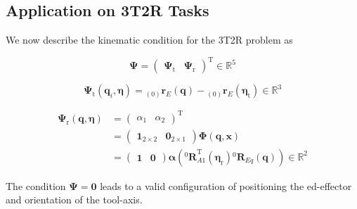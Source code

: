 \documentclass[twocolumn,10pt]{IFTOMM}
\newcommand{\bm}[1]{\boldsymbol{#1}}
\newcommand{\ortvek}[4]{{ }_{(#1)}{\boldsymbol{#2}}^{#3}_{#4} }
\newcommand{\rotmat}[2]{{{ }^{#1}\boldsymbol{R}}_{#2}}
\newcommand{\transp}[0]{{\mathrm{T}}}
\begin{document}
\subsection{Application on 3T2R Tasks}


We now describe the kinematic condition for the 3T2R problem as

\begin{equation}
\bm{\Psi}=\begin{pmatrix}
\bm{\Psi}_{\mathrm{t}} & \bm{\Psi}_{\mathrm{r}}
\end{pmatrix}^\transp \in {\mathbb{R}}^{5}
\end{equation}

\begin{equation}
\bm{\Psi}_{\mathrm{t}}(\bm{q}_i,\bm{\eta}) = \ortvek{0}{r}{}{E}(\bm{q}) - \ortvek{0}{r}{}{E}(\bm{\eta}_{\mathrm{t}}) \in {\mathbb{R}}^{3}
\end{equation}



\begin{align}
\bm{\Psi}_{\mathrm{r}}(\bm{q},\bm{\eta}) &= 
\begin{pmatrix}
\alpha_1  & \alpha_2
\end{pmatrix}^\transp  \\
&=
\begin{pmatrix} \bm{1}_{2 \times 2} & \bm{0}_{2 \times 1}\end{pmatrix} \bm{\Phi} (\bm{q},\bm{x}) \\
&= \begin{pmatrix} \bm{1} & \bm{0}\end{pmatrix} \bm{\alpha}\left(\rotmat{0}{A1}^\transp (\bm{\eta}_{\mathrm{r}})\rotmat{0}{Eq}(\bm{q})\right) \in {\mathbb{R}}^{2}
\end{align}

The condition $\bm{\Psi}=\bm{0}$ leads to a valid configuration of positioning the ed-effector and orientation of the tool-axis.




%
%
%
\end{document}
